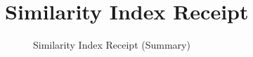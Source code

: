 \chapter{Similarity Index Receipt}
\begin{figure}[h]
    \centering
    \setlength{\fboxsep}{0pt}
    \caption{Similarity Index Receipt (Summary)}
    \label{fig:myfig89}
\end{figure}
\clearpage
